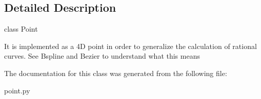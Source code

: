 \subsection{\-Detailed \-Description}
\begin{DoxyVerb}class Point

It is implemented as a 4D point in order to generalize
the calculation of rational curves. 
See Bspline and Bezier to understand what this means   
    
\end{DoxyVerb}
 

\-The documentation for this class was generated from the following file\-:\begin{DoxyCompactItemize}
\item 
point.\-py\end{DoxyCompactItemize}
